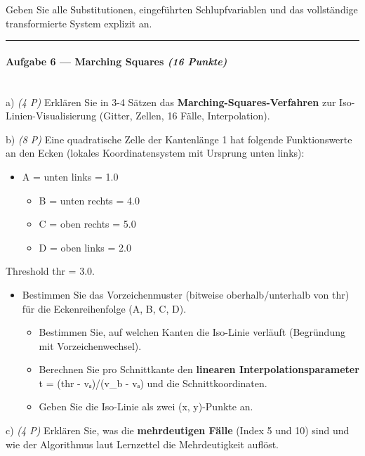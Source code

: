 \documentclass[11pt, a4paper]{article}
\begin{document}
Geben Sie alle Substitutionen, eingeführten Schlupfvariablen und das vollständige transformierte System explizit an.



\noindent\textcolor{rulegray}{\rule{\linewidth}{0.4pt}}


\paragraph{Aufgabe 6 — Marching Squares \textit{(16 Punkte)}}\mbox{}\\[2pt]

a) \textit{(4 P)} Erklären Sie in 3-4 Sätzen das \textbf{Marching-Squares-Verfahren} zur Iso-Linien-Visualisierung (Gitter, Zellen, 16 Fälle, Interpolation).


b) \textit{(8 P)} Eine quadratische Zelle der Kantenlänge 1 hat folgende Funktionswerte an den Ecken (lokales Koordinatensystem mit Ursprung unten links):


\begin{itemize}
  \item A = unten links = 1.0
\begin{itemize}
  \item B = unten rechts = 4.0
  \item C = oben rechts = 5.0
  \item D = oben links = 2.0
\end{itemize}
\end{itemize}

Threshold thr = 3.0.


\begin{itemize}
  \item Bestimmen Sie das Vorzeichenmuster (bitweise oberhalb/unterhalb von thr) für die Eckenreihenfolge (A, B, C, D).
\begin{itemize}
  \item Bestimmen Sie, auf welchen Kanten die Iso-Linie verläuft (Begründung mit Vorzeichenwechsel).
  \item Berechnen Sie pro Schnittkante den \textbf{linearen Interpolationsparameter} t = (thr - vₐ)/(v\_b - vₐ) und die Schnittkoordinaten.
  \item Geben Sie die Iso-Linie als zwei (x, y)-Punkte an.
\end{itemize}
\end{itemize}

c) \textit{(4 P)} Erklären Sie, was die \textbf{mehrdeutigen Fälle} (Index 5 und 10) sind und wie der Algorithmus laut Lernzettel die Mehrdeutigkeit auflöst.
\end{document}
